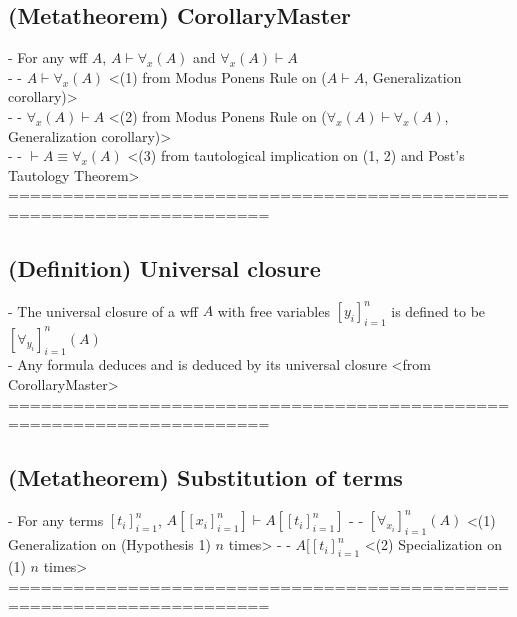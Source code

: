 \documentclass{article}
\begin{document}
\subsection{(Metatheorem) CorollaryMaster}
	- For any wff $A$, $A \vdash \forall_x(A)$ and $\forall_x(A) \vdash A$ \\
		- - $A \vdash \forall_x(A)$ <(1) from Modus Ponens Rule on ($A \vdash A$, Generalization corollary)> \\
		- - $\forall_x(A) \vdash A$ <(2) from Modus Ponens Rule on ($\forall_x(A) \vdash \forall_x(A)$, Generalization corollary)> \\
		- - $\vdash A \equiv \forall_x(A)$ <(3) from tautological implication on (1, 2) and Post's Tautology Theorem> \\
	======================================================================
\subsection{(Definition) Universal closure}
	- The universal closure of a wff $A$ with free variables $[y_i]_{i=1}^n$ is defined to be $[\forall_{y_i}]_{i=1}^n(A)$ \\
	- Any formula deduces and is deduced by its universal closure <from CorollaryMaster> \\
	======================================================================
\subsection{(Metatheorem) Substitution of terms}
	- For any terms $[t_i]_{i=1}^n$, $A[[x_i]_{i=1}^n] \vdash A[[t_i]_{i=1}^n]$
		- - $[\forall_{x_i}]_{i=1}^n(A)$ <(1) Generalization on (Hypothesis 1) $n$ times>
		- - $A[[t_i]_{i=1}^n$ <(2) Specialization on (1) $n$ times>
	======================================================================
\end{document}

